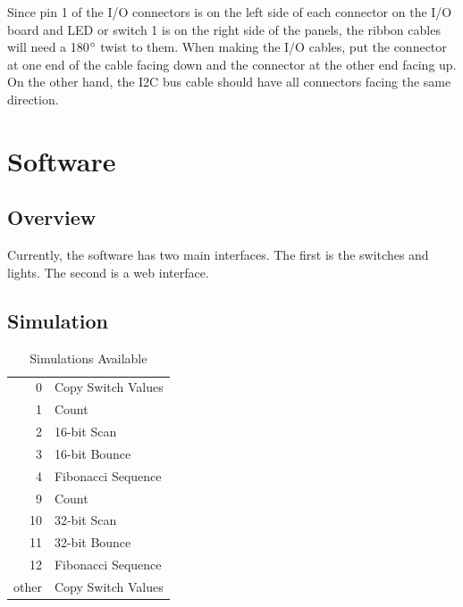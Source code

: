 \documentclass[10pt, openany]{book}
\begin{document}
Since pin 1 of the I/O connectors is on the left side of each connector on the I/O board and LED or switch 1 is on the right side of the panels, the ribbon cables will need a 180$\degree$ twist to them.  When making the I/O cables, put the connector at one end of the cable facing down and the connector at the other end facing up.  On the other hand, the I2C bus cable should have all connectors facing the same direction.
\chapter{Software}
\section{Overview}
Currently, the software has two main interfaces.  The first is the switches and lights.  The second is a web interface.

\section{Simulation}

\begin{table}
  \label{tbl:Simulations}
  \caption{Simulations Available}
  \centering
  \begin{tabular}{|r|l|}
    \hline
    0 & Copy Switch Values\\
    1 & Count\\
    2 & 16-bit Scan\\
    3 & 16-bit Bounce\\
    4 & Fibonacci Sequence\\
    9 & Count\\
    10 & 32-bit Scan\\
    11 & 32-bit Bounce\\
    12 & Fibonacci Sequence\\
    \hline
    other & Copy Switch Values\\
    \hline
  \end{tabular}
\end{table}
\end{document}
